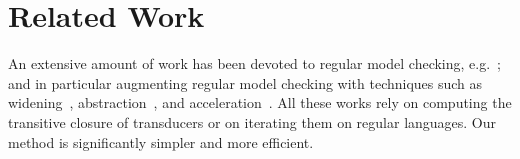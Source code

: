 %
\section{Related Work}
\label{section:related_work}
An extensive amount of work has been devoted to regular model checking,
e.g.~\cite{KMMPS2001,DLS01}; and in particular augmenting regular
model checking with techniques such as widening~\cite{BLW03,Tou01},
abstraction~\cite{BHV04}, and acceleration~\cite{AJNO:simple}. All
these works rely on computing the transitive closure of transducers or
on iterating them on regular languages. Our method is significantly simpler and more efficient. 

%

